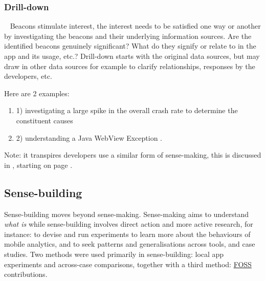 

\subsubsection{Drill-down}~\label{drill-down-research-method}
Beacons stimulate interest, the interest needs to be satisfied one way or another by investigating the beacons and their underlying information sources. 
Are the identified beacons genuinely significant? What do they signify or relate to in the app and its usage, etc.?  Drill-down starts with the original data sources, but may draw in other data sources for example to clarify relationships, responses by the developers, etc.

Here are 2 examples:  %
\begin{enumerate}
    \itemsep0em
    \item 1) investigating a large spike in the overall crash rate to determine the constituent causes 
    \item 2) understanding a Java WebView Exception .
\end{enumerate}

Note: it transpires developers use a similar form of sense-making, this is discussed in , starting on page \pageref{sensemaking-and-decision-taking-by-developers-section}.

\clearpage

\clearpage

\subsection{Sense-building}
Sense-building moves beyond sense-making. Sense-making aims to understand \textit{what is} while sense-building involves direct action and more active research, for instance: to devise and run experiments to learn more about the behaviours of mobile analytics, and to seek patterns and generalisations across tools, and case studies. Two methods were used primarily in sense-building: local app experiments and across-case comparisons, together with a third method: \href{glossary-FOSS}{FOSS} contributions. 

